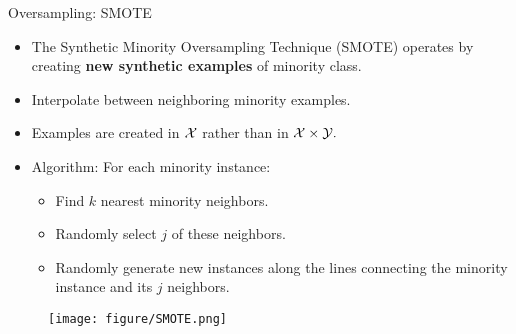 \documentclass[11pt,compress,t,notes=noshow, xcolor=table]{beamer}
\begin{document}
\begin{frame}{Oversampling: SMOTE}

    \begin{itemize}	
        \item The Synthetic Minority Oversampling Technique (SMOTE) operates by creating \textbf{new synthetic examples} of minority class.

        \item Interpolate between neighboring minority examples.

        \item Examples are created in $\mathcal{X}$ rather than in $\mathcal{X}\times\mathcal{Y}.$

        \item Algorithm: For each minority instance: 

        \begin{itemize} 

            \item Find $k$ nearest minority neighbors.
    
            \item Randomly select $j$ of these neighbors.
    
            \item Randomly generate new instances along the lines connecting the minority instance and its $j$ neighbors.
    
        \end{itemize}

    \end{itemize}

    \begin{figure}
        \centering
        \texttt{[image: figure/SMOTE.png]} 
    \end{figure}

\end{frame}

\endlecture
\end{document}
